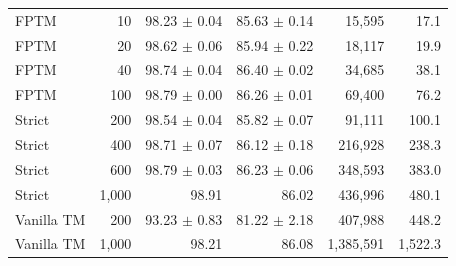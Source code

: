\begin{tabular}{lrrrrr}
FPTM & 10 & 98.23 $\pm$ 0.04 & 85.63 $\pm$ 0.14 & 15,595 & 17.1 \\
FPTM & 20 & 98.62 $\pm$ 0.06 & 85.94 $\pm$ 0.22 & 18,117 & 19.9 \\
FPTM & 40 & 98.74 $\pm$ 0.04 & 86.40 $\pm$ 0.02 & 34,685 & 38.1 \\
FPTM & 100 & 98.79 $\pm$ 0.00 & 86.26 $\pm$ 0.01 & 69,400 & 76.2 \\
Strict & 200 & 98.54 $\pm$ 0.04 & 85.82 $\pm$ 0.07 & 91,111 & 100.1 \\
Strict & 400 & 98.71 $\pm$ 0.07 & 86.12 $\pm$ 0.18 & 216,928 & 238.3 \\
Strict & 600 & 98.79 $\pm$ 0.03 & 86.23 $\pm$ 0.06 & 348,593 & 383.0 \\
Strict & 1,000 & 98.91 & 86.02 & 436,996 & 480.1 \\
Vanilla TM & 200 & 93.23 $\pm$ 0.83 & 81.22 $\pm$ 2.18 & 407,988 & 448.2 \\
Vanilla TM & 1,000 & 98.21 & 86.08 & 1,385,591 & 1,522.3 \\
\bottomrule
\end{tabular}
